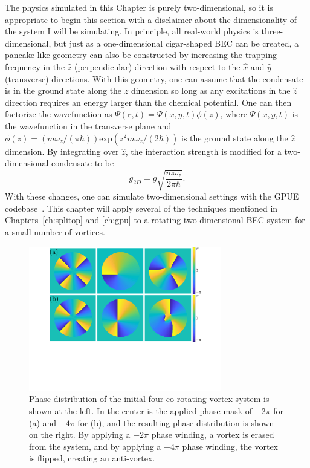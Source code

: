 The physics simulated in this Chapter is purely two-dimensional, so it is appropriate to begin this section with a disclaimer about the dimensionality of the system I will be simulating.
In principle, all real-world physics is three-dimensional, but just as a one-dimensional cigar-shaped BEC can be created, a pancake-like geometry can also be constructed by increasing the trapping frequency in the $\hat z$ (perpendicular) direction with respect to the $\hat x$ and $\hat y$ (transverse) directions.
With this geometry, one can assume that the condensate is in the ground state along the $\hat z$ dimension so long as any excitations in the $\hat z$ direction requires an energy larger than the chemical potential.
One can then factorize the wavefunction as $\Psi(\mathbf{r},t) = \Psi(x, y, t)\phi(z)$, where $\Psi(x, y, t)$ is the wavefunction in the transverse plane and $\phi(z) = (m \omega_z/(\pi\hbar))\text{exp}(z^2 m\omega_z/(2\hbar))$ is the ground state along the $\hat z$ dimension.
By integrating over $\hat z$, the interaction strength is modified for a two-dimensional condensate to be
\begin{equation}
g_{2D} = g \sqrt{\frac{m\omega_z}{2\pi\hbar}}.
\end{equation}
\noindent With these changes, one can simulate two-dimensional settings with the GPUE codebase~\cite{zhang2019, o2017, o2016topo, o2016}.
This chapter will apply several of the techniques mentioned in Chapters~\ref{ch:splitop} and \ref{ch:gpu} to a rotating two-dimensional BEC system for a small number of vortices.

\begin{figure}
\center \includegraphics[width=0.75\textwidth]{data/2d/phase/phase}

\caption{
Phase distribution of the initial four co-rotating vortex system is shown at the left.
In the center is the applied phase mask of $-2\pi$ for (a) and $-4\pi$ for (b), and the resulting phase distribution is shown on the right.
By applying a $-2\pi$ phase winding, a vortex is erased from the system, and by applying a $-4\pi$ phase winding, the vortex is flipped, creating an anti-vortex.
}
\label{fig:phase}
\end{figure}

